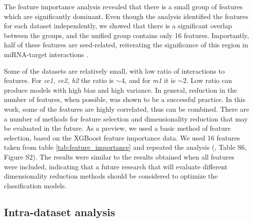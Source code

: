 \documentclass{bmcart}
\begin{document}

The feature importance analysis revealed that there is a small group of features which are significantly dominant. Even though the analysis identified the features for each dataset independently, we showed that there is a significant overlap between the groups, and the unified group contains only 16 features. Importantly, half of these features are seed-related, reiterating the significance of this region in miRNA-target interactions \cite{agarwal2015predicting}.

Some of the datasets are relatively small, with low ratio of interactions to features. For \textit{ce1, ce2, h2} the ratio is $\sim$4, and for \textit{m1} it is $\sim$2. Low ratio can produce models with high bias and high variance. In general, reduction in the number of features, when possible, was shown to be a successful practice. In this work, some of the features are highly correlated, thus can be combined. There are a number of methods for feature selection and dimensionality reduction that may be evaluated in the future. As a preview, we used a basic method of feature selection, based on the XGBoost feature importance data. We used 16 features taken from table \ref{tab:feature_importance} and repeated the analysis (, Table S6, Figure S2). The results were similar to the results obtained when all features were included, indicating that a future research that will evaluate different dimensionality reduction methods should be considered to optimize the classification models. 

\subsection*{Intra-dataset analysis}
\end{document}
